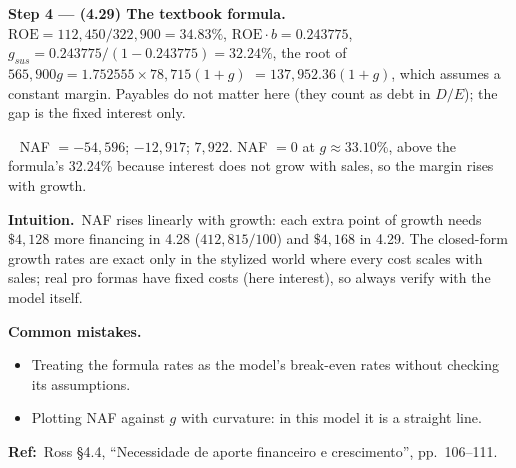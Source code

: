 \documentclass[11pt,a4paper]{article}
\newcommand{\step}[2]{\par\medskip\noindent\textbf{Step #1 --- #2.}~}
\newcommand{\intuition}{\par\medskip\noindent\textbf{Intuition.}~}
\newcommand{\refbib}{\par\smallskip\noindent\textbf{Ref:}~}
\newcommand{\answer}[1]{\par\smallskip\noindent\fbox{\textbf{Answer #1.}}~}
\newcommand{\pitfalls}{\par\medskip\noindent\textbf{Common mistakes.}}
\begin{document}
\step{4}{(4.29) The textbook formula} $\text{ROE}=112{,}450/322{,}900=34.83\%$, $\text{ROE}\cdot b=0.243775$,
$g_{sus}=0.243775/(1-0.243775)=32.24\%$, the root of $565{,}900g=1.752555\times78{,}715(1+g)$
$=137{,}952.36(1+g)$, which assumes a constant margin. Payables do not matter here (they count as debt
in $D/E$); the gap is the fixed interest only.
\answer{(4.29)} NAF $=-54{,}596$; $-12{,}917$; $7{,}922$. NAF $=0$ at $g\approx33.10\%$, above the formula's
32.24\% because interest does not grow with sales, so the margin rises with growth.

\begin{center}
\end{center}

\intuition NAF rises linearly with growth: each extra point of growth needs $\$4{,}128$ more financing
in 4.28 ($412{,}815/100$) and $\$4{,}168$ in 4.29. The closed-form growth rates are exact only in the
stylized world where every cost scales with sales; real pro formas have fixed costs (here interest), so
always verify with the model itself.
\pitfalls
\begin{itemize}
  \item Treating the formula rates as the model's break-even rates without checking its assumptions.
  \item Plotting NAF against $g$ with curvature: in this model it is a straight line.
\end{itemize}
\refbib{Ross \S4.4, ``Necessidade de aporte financeiro e crescimento'', pp.~106--111.}
\end{document}
